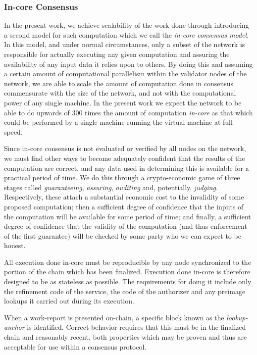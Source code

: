 \subsubsection{In-core Consensus}
In the present work, we achieve scalability of the work done through introducing a second model for such computation which we call the \emph{in-core consensus model}. In this model, and under normal circumstances, only a subset of the network is responsible for actually executing any given computation and assuring the availability of any input data it relies upon to others. By doing this and assuming a certain amount of computational parallelism within the validator nodes of the network, we are able to scale the amount of computation done in consensus commensurate with the size of the network, and not with the computational power of any single machine. In the present work we expect the network to be able to do upwards of 300 times the amount of computation \emph{in-core} as that which could be performed by a single machine running the virtual machine at full speed.

Since in-core consensus is not evaluated or verified by all nodes on the network, we must find other ways to become adequately confident that the results of the computation are correct, and any data used in determining this is available for a practical period of time. We do this through a crypto-economic game of three stages called \emph{guaranteeing}, \emph{assuring}, \emph{auditing} and, potentially, \emph{judging}. Respectively, these attach a substantial economic cost to the invalidity of some proposed computation; then a sufficient degree of confidence that the inputs of the computation will be available for some period of time; and finally, a sufficient degree of confidence that the validity of the computation (and thus enforcement of the first guarantee) will be checked by some party who we can expect to be honest.

All execution done in-core must be reproducible by any node synchronized to the portion of the chain which has been finalized. Execution done in-core is therefore designed to be as stateless as possible. The requirements for doing it include only the refinement code of the service, the code of the authorizer and any preimage lookups it carried out during its execution.

When a work-report is presented on-chain, a specific block known as the \emph{lookup-anchor} is identified. Correct behavior requires that this must be in the finalized chain and reasonably recent, both properties which may be proven and thus are acceptable for use within a consensus protocol.

